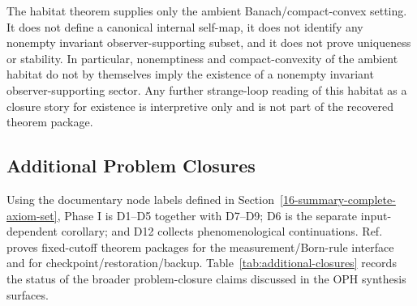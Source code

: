 The habitat theorem supplies only the ambient Banach/compact-convex setting. It does not define a
canonical internal self-map, it does not identify any nonempty invariant observer-supporting subset,
and it does not prove uniqueness or stability. In particular, nonemptiness and compact-convexity
of the ambient habitat do not by themselves imply the existence of a nonempty invariant
observer-supporting sector. Any further strange-loop reading of this habitat as a closure story
for existence is interpretive only and is not part of the recovered theorem package.

\subsection{Additional Problem Closures}

Using the documentary node labels defined in Section~\ref{16-summary-complete-axiom-set}, Phase I
is D1--D5 together with D7--D9; D6 is the separate input-dependent corollary; and D12
collects phenomenological continuations. Ref.~\cite{ophmicrophysics} proves fixed-cutoff theorem
packages for the measurement/Born-rule interface and for checkpoint/restoration/backup.
Table~\ref{tab:additional-closures} records the status of the broader problem-closure claims
discussed in the OPH synthesis surfaces.

